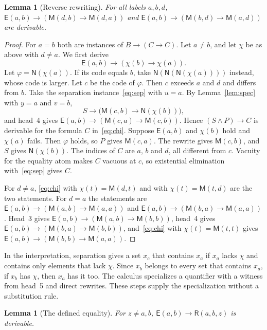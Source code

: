 \documentclass[11pt,letterpaper]{article}
\newtheorem{lemma}[theorem]{Lemma}
\newcommand{\Mc}{\mathsf{M}}
\newcommand{\Ec}{\mathsf{E}}
\newcommand{\Nc}{\mathsf{N}}
\newcommand{\Rc}{\mathsf{R}}
\begin{document}
\begin{lemma}[Reverse rewriting]\label{lem:rev}
For all labels $a,b,d$,
$\Ec(a,b)\to(\Mc(d,b)\to\Mc(d,a))$ and
$\Ec(a,b)\to(\Mc(b,d)\to\Mc(a,d))$ are derivable.
\end{lemma}

\begin{proof}
For $a=b$ both are instances of $B\to(C\to C)$. Let $a\ne b$, and let
$\chi$ be as above with $d\ne a$. We first derive
\begin{equation}\label{eq:chi}
 \Ec(a,b)\to(\chi(b)\to\chi(a)).
\end{equation}
Let $\varphi=\Nc(\chi(a))$. If its code equals $b$, take
$\Nc(\Nc(\Nc(\chi(a))))$ instead, whose code is larger. Let $c$ be the
code of $\varphi$. Then $c$ exceeds $a$ and $d$ and differs from $b$.
Take the separation instance~\eqref{eq:sep} with $u=a$. By
Lemma~\ref{lem:spec} with $y=a$ and $v=b$,
\[
 S\to\bigl(\Mc(c,b)\to\Nc(\chi(b))\bigr),
\]
and head~4 gives $\Ec(a,b)\to(\Mc(c,a)\to\Mc(c,b))$. Hence
$(S\wedge P)\to C$ is derivable for the formula $C$ in~\eqref{eq:chi}.
Suppose $\Ec(a,b)$ and $\chi(b)$ hold and $\chi(a)$ fails. Then
$\varphi$ holds, so $P$ gives $\Mc(c,a)$. The rewrite gives
$\Mc(c,b)$, and $S$ gives $\Nc(\chi(b))$. The indices of $C$ are
$a$, $b$ and $d$, all different from $c$. Vacuity for the equality
atom makes $C$ vacuous at $c$, so existential elimination
with~\eqref{eq:sep} gives $C$.

For $d\ne a$, \eqref{eq:chi} with $\chi(t)=\Mc(d,t)$ and with
$\chi(t)=\Mc(t,d)$ are the two statements. For $d=a$ the statements
are $\Ec(a,b)\to(\Mc(a,b)\to\Mc(a,a))$ and
$\Ec(a,b)\to(\Mc(b,a)\to\Mc(a,a))$. Head~3 gives
$\Ec(a,b)\to(\Mc(a,b)\to\Mc(b,b))$, head~4 gives
$\Ec(a,b)\to(\Mc(b,a)\to\Mc(b,b))$, and~\eqref{eq:chi} with
$\chi(t)=\Mc(t,t)$ gives $\Ec(a,b)\to(\Mc(b,b)\to\Mc(a,a))$.
\end{proof}

In the interpretation, separation gives a set $x_c$ that contains
$x_a$ if $x_a$ lacks $\chi$ and contains only elements that lack
$\chi$. Since $x_b$ belongs to every set that contains $x_a$, if
$x_b$ has $\chi$, then $x_a$ has it too. The calculus specializes a
quantifier with a witness from head~5 and direct rewrites. These
steps supply the specialization without a substitution rule.

\pagebreak[2]
\begin{lemma}[The defined equality]\label{lem:nbhd}
For $z\ne a,b$, $\Ec(a,b)\to\Rc(a,b,z)$ is derivable.
\end{lemma}
\end{document}
